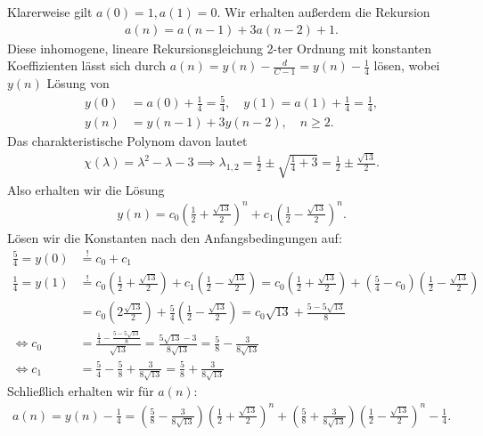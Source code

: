 \begin{solution}
Klarerweise gilt $a(0) = 1, a(1) = 0$. Wir erhalten außerdem die Rekursion
\begin{align*}
  a(n) = a(n-1) + 3a(n-2) + 1.
\end{align*}
Diese inhomogene, lineare Rekursionsgleichung 2-ter Ordnung mit konstanten
Koeffizienten lässt sich durch $a(n) = y(n) - \frac{d}{C-1} = y(n) - \frac{1}{4}$ lösen, wobei $y(n)$
Lösung von
\begin{align*}
  y(0) &= a(0) + \frac{1}{4} = \frac{5}{4}, \quad y(1) = a(1) + \frac{1}{4} = \frac{1}{4}, \\
  y(n) &= y(n-1) + 3y(n-2), \quad n \geq 2.
\end{align*}
Das charakteristische Polynom davon lautet
\begin{align*}
  \chi(\lambda) = \lambda^2 - \lambda - 3 \implies \lambda_{1,2} = \frac{1}{2} \pm \sqrt{\frac{1}{4} + 3}
  = \frac{1}{2} \pm \frac{\sqrt{13}}{2}.
\end{align*}
Also erhalten wir die Lösung
\begin{align*}
  y(n) = c_0\left(\frac{1}{2} + \frac{\sqrt{13}}{2}\right)^n +
        c_1\left(\frac{1}{2} - \frac{\sqrt{13}}{2}\right)^n.
\end{align*}
Lösen wir die Konstanten nach den Anfangsbedingungen auf:
\begin{align*}
  \frac{5}{4} = y(0) &\stackrel{!}{=} c_0 + c_1 \\
  \frac{1}{4} = y(1) &\stackrel{!}{=} c_0\left(\frac{1}{2} + \frac{\sqrt{13}}{2}\right) +
        c_1\left(\frac{1}{2} - \frac{\sqrt{13}}{2}\right)
        =c_0\left(\frac{1}{2} + \frac{\sqrt{13}}{2}\right) +
              (\frac{5}{4} - c_0)\left(\frac{1}{2} - \frac{\sqrt{13}}{2}\right) \\
        &= c_0\left(2\frac{\sqrt{13}}{2}\right) + \frac{5}{4}\left(\frac{1}{2} - \frac{\sqrt{13}}{2}\right)
        = c_0\sqrt{13} + \frac{5 - 5\sqrt{13}}{8} \\
        \iff c_0 &= \frac{\frac{1}{4} - \frac{5 - 5\sqrt{13}}{8}}{\sqrt{13}}
        = \frac{5\sqrt{13}- 3}{8\sqrt{13}} = \frac{5}{8} - \frac{3}{8\sqrt{13}} \\
        \iff c_1 &= \frac{5}{4} - \frac{5}{8} + \frac{3}{8\sqrt{13}}
        = \frac{5}{8} + \frac{3}{8\sqrt{13}}
\end{align*}
Schließlich erhalten wir für $a(n)$:
\begin{align*}
  a(n) = y(n) - \frac{1}{4} = \left(\frac{5}{8} - \frac{3}{8\sqrt{13}}\right)\left(\frac{1}{2} +
   \frac{\sqrt{13}}{2}\right)^n + \left(\frac{5}{8} + \frac{3}{8\sqrt{13}}\right)\left(\frac{1}{2} - \frac{\sqrt{13}}{2}\right)^n - \frac{1}{4}.
\end{align*}
\end{solution}

